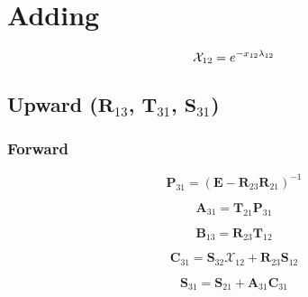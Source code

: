 %
\section{Adding}
\label{sec:adding}

\begin{equation}
\mathcal{X}_{12} = e^{-x_{12} \lambda_{12}}
\label{eq:adding-layer_trans}
\end{equation}


%
\subsection{Upward ($\mathbf{R}_{13}$, $\mathbf{T}_{31}$, $\mathbf{S}_{31}$)}
\label{sec:adding-upward}

\subsubsection{Forward}
\label{sec:adding-upward-forward}

\begin{equation}
\mathbf{P}_{31} = (\mathbf{E} - \mathbf{R}_{23}\mathbf{R}_{21})^{-1}
\label{eq:adding-upward-forward-P31}
\end{equation}

\begin{equation}
\mathbf{A}_{31} = \mathbf{T}_{21}\mathbf{P}_{31}
\label{eq:adding-upward-forward-B31}
\end{equation}

\begin{equation}
\mathbf{B}_{13} = \mathbf{R}_{23}\mathbf{T}_{12}
\label{eq:adding-upward-forward-B13}
\end{equation}

\begin{equation}
\mathbf{C}_{31} = \mathbf{S}_{32}\mathcal{X}_{12} + \mathbf{R}_{23}\mathbf{S}_{12}
\label{eq:adding-upward-forward-C31}
\end{equation}

\begin{equation}
\mathbf{S}_{31} = \mathbf{S}_{21} + \mathbf{A}_{31}\mathbf{C}_{31}
\label{eq:adding-upward-forward-S31}
\end{equation}

